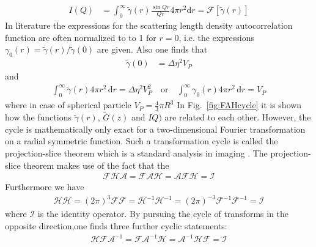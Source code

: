 \begin{align}
I(Q) &= \int_0^\infty \tilde{\gamma}(r) \frac{\sin Qr}{Qr}4\pi r^2\mathrm{d}r = \mathcal{F}\left[\tilde{\gamma}(r)\right]
\end{align}
In literature the expressions for the scattering length density autocorrelation function are often normalized to to 1 for $r=0$, i.e. the expressions $\gamma_0(r)=\tilde{\gamma}(r)/\tilde{\gamma}(0)$ are given. Also one finds that
\begin{align}
\tilde{\gamma}(0)&=\Delta\eta^2 V_P
\end{align}
and
\begin{align}
\int_0^\infty \tilde{\gamma}(r) 4\pi r^2 \, \mathrm{d}r =\Delta\eta^2 V_P^2 \quad \mbox{or} \quad  \int_0^\infty \gamma_0(r) 4\pi r^2 \, \mathrm{d}r = V_P
\end{align}
where in case of spherical particle $V_P=\frac43 \pi R^3$
In Fig.\ \ref{fig:FAHcycle} it is shown how the functions $\tilde{\gamma}(r)$, $\tilde{G}(z)$ and $IQ)$ are related to each other. However, the cycle is mathematically only exact for a two-dimensional Fourier transformation on a radial symmetric function. 
Such a transformation cycle is called the projection-slice theorem which is a standard analysis in imaging \cite{Bracewell2003}. The projection-slice theorem makes use of the fact that the
\begin{align}
\mathcal{F}\mathcal{H}\mathcal{A}=\mathcal{F}\mathcal{A}\mathcal{H}=\mathcal{A}\mathcal{F}\mathcal{H}=\mathcal{I}
\end{align}
Furthermore we have
\begin{align}
\mathcal{HH}=(2\pi)^3\mathcal{FF}=\mathcal{H}^{-1}\mathcal{H}^{-1}=(2\pi)^{-3}\mathcal{F}^{-1}\mathcal{F}^{-1}=\mathcal{I}
\end{align}
where $\mathcal{I}$ is the identity operator.
By pursuing the cycle of transforms in the opposite direction,one finds three further cyclic statements:
\begin{align}
\mathcal{HF}\mathcal{A}^{-1}=\mathcal{F}\mathcal{A}^{-1}\mathcal{H}=\mathcal{A}^{-1}\mathcal{HF}=\mathcal{I}
\end{align}

